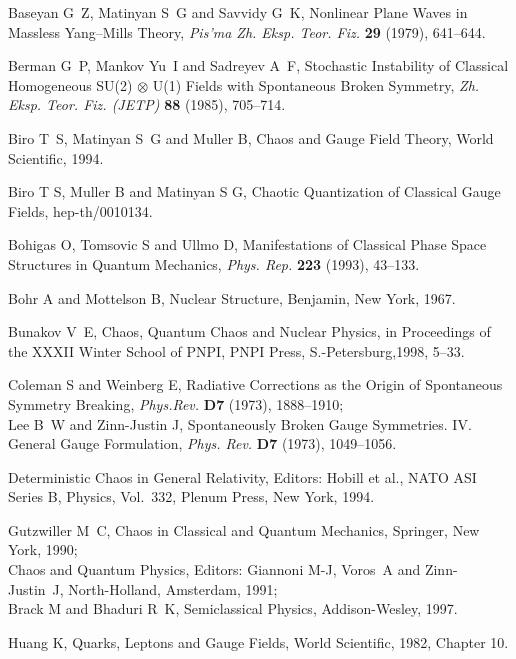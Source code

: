 \documentclass[a4paper,12pt]{article}
\begin{document}
\begin{thebibliography}{99}
\small

 Baseyan G~Z, Matinyan S~G and  Savvidy G~K, Nonlinear Plane Waves in
Massless Yang--Mills Theory, {\it Pis'ma Zh. Eksp. Teor. Fiz.} {\bf 29} (1979),
641--644.

 Berman G~P, Mankov Yu~I and  Sadreyev A~F, Stochastic Instability of Classical
Homogeneous SU(2)$\, \otimes\,$U(1) Fields with Spontaneous Broken Symmetry, {\it Zh.
Eksp. Teor. Fiz. (JETP)} {\bf 88} (1985), 705--714.

 Biro T~S, Matinyan S~G and Muller B, Chaos and
Gauge Field Theory, World Scientific, 1994.

 Biro T S, Muller B and Matinyan S G, Chaotic Quantization of Classical
Gauge Fields, hep-th/0010134.

 Bohigas O, Tomsovic S and Ullmo D,
Manifestations of Classical Phase Space Structures in Quantum Mechanics, {\it Phys.
Rep.} {\bf 223} (1993), 43--133.

 Bohr A and Mottelson B, Nuclear Structure, Benjamin, New York, 1967.

  Bunakov V~E, Chaos, Quantum Chaos and Nuclear Physics,
in Proceedings of the XXXII Winter School of PNPI,  PNPI Press, S.-Petersburg,1998,
5--33.

  Coleman  S and  Weinberg E, Radiative Corrections as the Origin of
Spontaneous Symmetry Breaking, {\it Phys.Rev.} {\bf D7} (1973), 1888--1910;\\
Lee B~W and Zinn-Justin J, Spontaneously Broken Gauge Symmetries. IV. General Gauge
Formulation, {\it Phys. Rev.} {\bf D7} (1973), 1049--1056.

 Deterministic Chaos in General Relativity, Editors:
Hobill et al., NATO ASI Series B, Physics,  Vol.~332, Plenum Press, New York, 1994.

Gutzwiller M~C, Chaos in Classical and Quantum Mechanics, Springer, New York, 1990;\\
Chaos and Quantum Physics, Editors: Giannoni M-J, Voros~A and Zinn-Justin~J,
North-Holland, Amsterdam, 1991;\\
Brack M and Bhaduri R~K, Semiclassical Physics, Addison-Wesley, 1997.

  Huang K,  Quarks, Leptons and Gauge Fields, World
                Scientific, 1982, Chapter 10.


\end{thebibliography}
\end{document}
